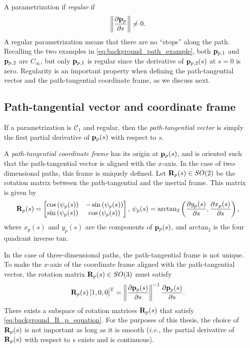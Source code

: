 A parametrization if \emph{regular} if
\begin{equation}
    \left\|\frac{\partial \mathbf{p}_p}{\partial s}\right\| \neq 0.
\end{equation}
A regular parametrization means that there are no ``stops'' along the path.
Recalling the two examples in \eqref{eq:background_path_example}, both $\mathbf{p}_{p, 1}$ and $\mathbf{p}_{p, 2}$ are $C_{\infty}$, but only $\mathbf{p}_{p, 1}$ is regular since the derivative of $\mathbf{p}_{p, 2}(s)$ at $s = 0$ is zero.
Regularity is an important property when defining the path-tangential vector and the path-tangential coordinate frame, as we discuss next.

\subsection{Path-tangential vector and coordinate frame}
\label{sec:background_path_tangential}
If a parametrization is $\mathcal{C}_1$ and regular, then the \emph{path-tangential vector} is simply the first partial derivative of $\mathbf{p}_p(s)$ with respect to $s$.

A \emph{path-tangential coordinate frame} has its origin at $\mathbf{p}_p(s)$, and is oriented such that the path-tangential vector is aligned with the $x$-axis.
In the case of two-dimensional paths, this frame is uniquely defined.
Let $\mathbf{R}_p(s) \in SO(2)$ be the rotation matrix between the path-tangential and the inertial frame.
This matrix is given by
\begin{equation}
    \mathbf{R}_p(s) = 
    \begin{bmatrix}
        \cos\left(\psi_{p}(s)\right) & -\sin\left(\psi_{p}(s)\right) \\ \sin\left(\psi_{p}(s)\right) & \cos\left(\psi_{p}(s)\right)
    \end{bmatrix}, \,
    \psi_{p}(s) = \mathrm{arctan}_{2}\left(\frac{\partial  y_{p}(s)}{\partial s}, \frac{\partial  x_{p}(s)}{\partial s}\right),
    \label{eq:background_path_tangential_2D}
\end{equation}
where $x_p(s)$ and $y_p(s)$ are the components of $\mathbf{p}_p(s)$, and $\mathrm{arctan}_2$ is the four quadrant inverse tan.

In the case of three-dimensional paths, the path-tangential frame is not unique.
To make the $x$-axis of the coordinate frame aligned with the path-tangential vector, the rotation matrix $\mathbf{R}_p(s) \in SO(3)$ must satisfy
\begin{equation}
    \mathbf{R}_p(s) \left[1, 0, 0\right]^{\mathrm{T}} = \left\|\frac{\partial \mathbf{p}_p(s)}{\partial s}\right\|^{-1} \frac{\partial \mathbf{p}_p(s)}{\partial s}.
    \label{eq:background_R_p_equation}
\end{equation}
There exists a subspace of rotation matrices $\mathbf{R}_p(s)$ that satisfy \eqref{eq:background_R_p_equation}.
For the purposes of this thesis, the choice of $\mathbf{R}_p(s)$ is not important as long as it is smooth (\emph{i.e.,} the partial derivative of $\mathbf{R}_p(s)$ with respect to $s$ exists and is continuous).

